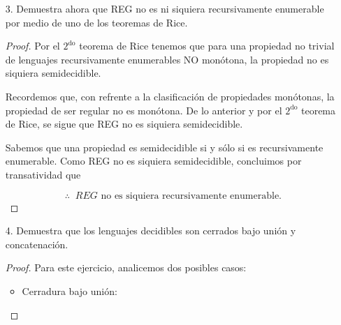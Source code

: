 \documentclass{article}
\begin{document}
\begin{enumerate}
\item[3.] Demuestra ahora que REG no es ni siquiera recursivamente enumerable
  por medio de uno de los teoremas de Rice.
  \begin{proof} Por el $2^{\text{do}}$ teorema de Rice tenemos que para una
    propiedad no trivial de lenguajes recursivamente enumerables NO monótona, la propiedad
    no es siquiera semidecidible.

    Recordemos que, con refrente a la clasificación de propiedades monótonas,
    la propiedad de ser regular no es monótona. De lo anterior y por el $2^{\text{do}}$
    teorema de Rice, se sigue que REG no es siquiera semidecidible.

    Sabemos que una propiedad es semidecidible si y sólo si es recursivamente enumerable.
    Como REG no es siquiera semidecidible, concluimos por transatividad que
    
    \[ \therefore\;\; REG \text{ no es siquiera recursivamente enumerable.}\]
  \end{proof}
\item[4.] Demuestra que los lenguajes decidibles son cerrados bajo unión y
  concatenación.
  \begin{proof}
    Para este ejercicio, analicemos dos posibles casos:
    \newcommand{\localtextbulletone}{\textcolor{black}{\raisebox{.45ex}{\rule{.6ex}{.6ex}}}}
    \renewcommand{\labelitemi}{\localtextbulletone}
    \begin{itemize}
    \item Cerradura bajo unión:
      

\end{itemize}
\end{proof}
\end{enumerate}
\end{document}
